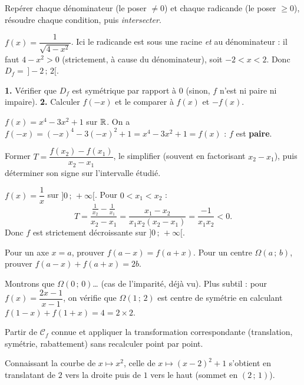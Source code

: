Repérer chaque dénominateur (le poser $\neq 0$) et chaque radicande (le poser
$\ge 0$), résoudre chaque condition, puis \emph{intersecter}.
\begin{exemple}
$f(x)=\dfrac{1}{\sqrt{4-x^2}}$. Ici le radicande est sous une racine \emph{et} au
dénominateur : il faut $4-x^2>0$ (strictement, à cause du dénominateur), soit
$-2<x<2$. Donc $D_f=\,]-2\,;\,2[$.
\end{exemple}

\textbf{1.} Vérifier que $D_f$ est symétrique par rapport à $0$ (sinon, $f$ n'est ni
paire ni impaire). \textbf{2.} Calculer $f(-x)$ et le comparer à $f(x)$ et $-f(x)$.
\begin{exemple}
$f(x)=x^4-3x^2+1$ sur $\mathbb{R}$. On a $f(-x)=(-x)^4-3(-x)^2+1=x^4-3x^2+1=f(x)$ :
$f$ est \textbf{paire}.
\end{exemple}

Former $T=\dfrac{f(x_2)-f(x_1)}{x_2-x_1}$, le simplifier (souvent en factorisant
$x_2-x_1$), puis déterminer son signe sur l'intervalle étudié.
\begin{exemple}
$f(x)=\dfrac{1}{x}$ sur $]0\,;\,+\infty[$. Pour $0<x_1<x_2$ :
\[ T=\frac{\frac1{x_2}-\frac1{x_1}}{x_2-x_1}=\frac{x_1-x_2}{x_1x_2(x_2-x_1)}=\frac{-1}{x_1x_2}<0. \]
Donc $f$ est strictement décroissante sur $]0\,;\,+\infty[$.
\end{exemple}

Pour un axe $x=a$, prouver $f(a-x)=f(a+x)$. Pour un centre $\Omega(a\,;\,b)$, prouver
$f(a-x)+f(a+x)=2b$.
\begin{exemple}
Montrons que $\Omega(0\,;\,0)$… (cas de l'imparité, déjà vu). Plus subtil :
pour $f(x)=\dfrac{2x-1}{x-1}$, on vérifie que $\Omega(1\,;\,2)$ est centre de symétrie
en calculant $f(1-x)+f(1+x)=4=2\times 2$.
\end{exemple}

Partir de $\mathcal{C}_f$ connue et appliquer la transformation correspondante
(translation, symétrie, rabattement) sans recalculer point par point.
\begin{exemple}
Connaissant la courbe de $x\mapsto x^2$, celle de $x\mapsto (x-2)^2+1$ s'obtient en
translatant de $2$ vers la droite puis de $1$ vers le haut (sommet en $(2\,;\,1)$).
\end{exemple}
